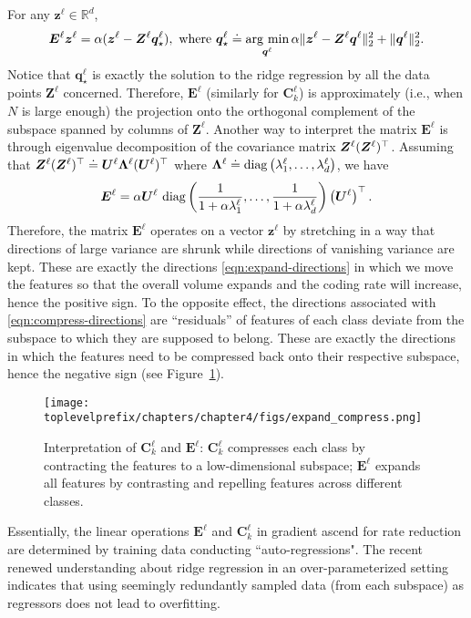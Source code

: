 \documentclass[\toplevelprefix/book-main.tex]{subfiles}
\begin{document}
\begin{remark}\label{rem:regression-interpretation} 
For any $\bm z^\ell \in \mathbb{R}^d$,
\begin{gather}
    \bm E^\ell \bm z^\ell = \alpha(\bm z^\ell - \bm Z^\ell \bm q^\ell_\star),\
    \mbox{where}\ \bm q^\ell_\star \doteq \operatorname*{arg\ min}_{\bm q^\ell} \alpha \|\bm z^\ell - \bm Z^\ell \bm q^\ell\|_2^2 + \|\bm q^\ell\|_2^2.
\end{gather}
Notice that $\bm q^\ell_\star$ is exactly the solution to the ridge regression by all the data points $\bm Z^\ell$ concerned. Therefore, $\bm E^\ell$ (similarly for $\bm C^\ell_k$) is approximately (i.e., when $N$ is large enough) the projection onto the orthogonal complement of the subspace spanned by columns of $\bm Z^\ell$. Another way to interpret the matrix $\bm E^\ell$ is through eigenvalue decomposition of the covariance matrix $\bm{Z}^\ell (\bm{Z}^\ell)^\top$. Assuming that $\bm{Z}^\ell (\bm{Z}^\ell)^\top \doteq \bm U^\ell \bm \Lambda^\ell (\bm U^\ell)^\top$ where $\bm \Lambda^\ell \doteq \operatorname{diag}\left(\lambda^\ell_1, \ldots, \lambda^\ell_d \right)$, we have 
\begin{equation}
\bm E^\ell = \alpha \bm U^\ell\, \operatorname{diag}\left(\frac{1}{1+\alpha\lambda^\ell_1}, \ldots, \frac{1}{1+\alpha\lambda^\ell_d}\right) \left(\bm U^\ell\right)^\top.
\end{equation}
Therefore, the matrix $\bm E^\ell$ operates on a vector $\bm z^\ell$ by stretching in a way that directions of large variance are shrunk while directions of vanishing variance are kept. These are exactly the directions \eqref{eqn:expand-directions} in which we move the features so that the overall volume expands and the coding rate will increase, hence the positive sign. To the opposite effect, the directions associated with \eqref{eqn:compress-directions} are ``residuals'' of features of each class deviate from the subspace to which they are supposed to belong. These are exactly the directions in which the features need to be compressed back onto their respective subspace, hence the negative sign (see Figure~\ref{fig:regression-interpretation}). 

\begin{figure}[t]
    \centering
    \texttt{[image: \\toplevelprefix/chapters/chapter4/figs/expand\_compress.png]}
    \caption{\small Interpretation of $\bm C^\ell_k$ and $\bm E^\ell$: $\bm C^\ell_k$ compresses each class by contracting the features to a low-dimensional subspace; $\bm E^\ell$ expands all features by contrasting and repelling features across different classes.}
    \label{fig:regression-interpretation}
    \vspace{-0.1in}
\end{figure}


Essentially, the linear operations $\bm E^\ell$ and $\bm C_k^\ell$ in gradient ascend for rate reduction are determined by training data conducting ``auto-regressions". The recent renewed understanding about ridge regression in an over-parameterized setting \cite{yang2020rethinking,Wu2020OnTO} indicates that using seemingly redundantly sampled data (from each subspace) as regressors does not lead to overfitting.
\end{remark}
\end{document}
